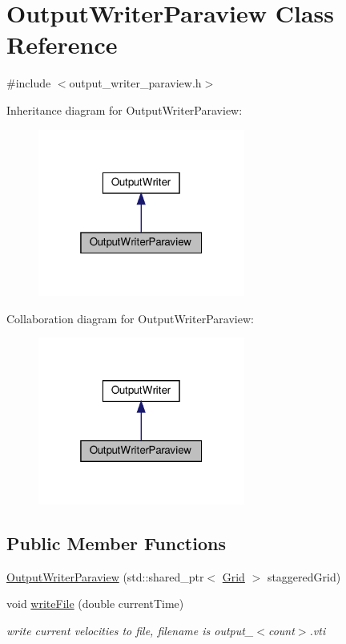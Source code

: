 \hypertarget{classOutputWriterParaview}{}\section{Output\+Writer\+Paraview Class Reference}
\label{classOutputWriterParaview}


{\ttfamily \#include $<$output\+\_\+writer\+\_\+paraview.\+h$>$}



Inheritance diagram for Output\+Writer\+Paraview\+:\nopagebreak
\begin{figure}[H]
\begin{center}
\leavevmode
\includegraphics[width=193pt]{classOutputWriterParaview__inherit__graph}
\end{center}
\end{figure}


Collaboration diagram for Output\+Writer\+Paraview\+:\nopagebreak
\begin{figure}[H]
\begin{center}
\leavevmode
\includegraphics[width=193pt]{classOutputWriterParaview__coll__graph}
\end{center}
\end{figure}
\subsection*{Public Member Functions}
\begin{DoxyCompactItemize}
\item 
\mbox{\hyperlink{classOutputWriterParaview_ad746db20555053729cc199ec4433a0ca}{Output\+Writer\+Paraview}} (std\+::shared\+\_\+ptr$<$ \mbox{\hyperlink{classGrid}{Grid}} $>$ staggered\+Grid)
\item 
void \mbox{\hyperlink{classOutputWriterParaview_a9e203b63d0e2f26ad53d18ee1821c6bb}{write\+File}} (double current\+Time)
\begin{DoxyCompactList}\small\item\em write current velocities to file, filename is output\+\_\+$<$count$>$.\+vti \end{DoxyCompactList}\end{DoxyCompactItemize}
